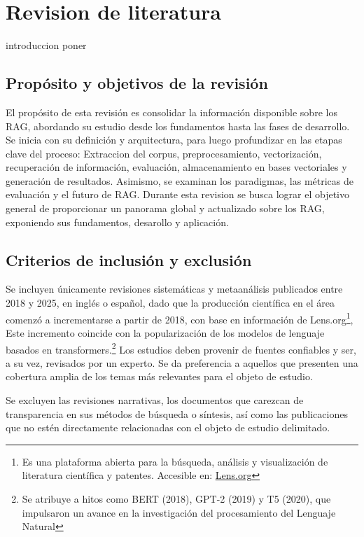 \section{Revision de literatura}

introduccion poner 

\subsection{Propósito y objetivos de la revisión}
El propósito de esta revisión es consolidar la información disponible sobre los RAG, abordando su estudio desde los fundamentos hasta las fases de desarrollo. 
Se inicia con su definición y arquitectura, para luego profundizar en las etapas clave del proceso: Extraccion del corpus, preprocesamiento, vectorización, recuperación de información, 
evaluación, almacenamiento en bases vectoriales y generación de resultados. Asimismo, se examinan los paradigmas, las métricas de evaluación y el futuro de RAG.
Durante esta revision se busca lograr el objetivo general de proporcionar un panorama global y actualizado sobre los RAG,
exponiendo sus fundamentos, desarollo y aplicación.

\subsection{Criterios de inclusión y exclusión}
Se incluyen únicamente revisiones sistemáticas y metaanálisis publicados entre 2018 y 2025, en inglés o español, dado que la producción 
científica en el área comenzó a incrementarse a partir de 2018, con base en información de Lens.org\footnote{Es una plataforma abierta
para la búsqueda, análisis y visualización de literatura científica y patentes. Accesible en: \href{https://www.lens.org/}{Lens.org}},  Este incremento coincide
con la popularización 
de los modelos de lenguaje basados en transformers.\footnote{Se atribuye a hitos como BERT (2018), GPT-2 (2019) y T5 (2020), que impulsaron un avance 
en la investigación del procesamiento del Lenguaje Natural}
Los estudios deben provenir de fuentes confiables y ser, a su vez, revisados por 
un experto. Se da preferencia a aquellos que presenten una cobertura amplia de los temas más relevantes para el objeto de estudio.  

Se excluyen las revisiones narrativas, los documentos que carezcan de transparencia en sus métodos de búsqueda o síntesis, así como las publicaciones que no estén 
directamente relacionadas con el objeto de estudio delimitado.

